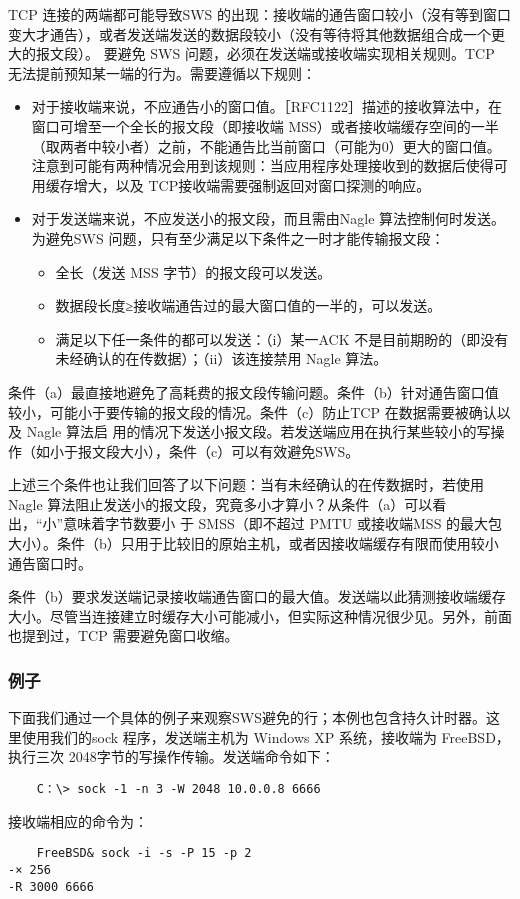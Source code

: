 TCP 连接的两端都可能导致SWS 的出现：接收端的通告窗口较小（沒有等到窗口变大才通告），或者发送端发送的数据段较小（没有等待将其他数据组合成一个更大的报文段）。
要避免 SWS 问题，必须在发送端或接收端实现相关规则。TCP 无法提前预知某一端的行为。需要遵循以下规则：
\begin{itemize}
    \item 对于接收端来说，不应通告小的窗口值。［RFC1122］描述的接收算法中，在窗口可增至一个全长的报文段（即接收端 MSS）或者接收端缓存空间的一半（取两者中较小者）之前，不能通告比当前窗口（可能为0）更大的窗口值。注意到可能有两种情况会用到该规则：当应用程序处理接收到的数据后使得可用缓存增大，以及 TCP接收端需要强制返回对窗口探测的响应。
    \item 对于发送端来说，不应发送小的报文段，而且需由Nagle 算法控制何时发送。为避免SWS 问题，只有至少满足以下条件之一时才能传输报文段：
    \begin{itemize}
        \item 全长（发送 MSS 字节）的报文段可以发送。
        \item 数据段长度≥接收端通告过的最大窗口值的一半的，可以发送。
        \item 满足以下任一条件的都可以发送：（i）某一ACK 不是目前期盼的（即没有未经确认的在传数据）；（ii）该连接禁用 Nagle 算法。
    \end{itemize}
\end{itemize}

条件（a）最直接地避免了高耗费的报文段传输问题。条件（b）针对通告窗口值较小，可能小于要传输的报文段的情况。条件（c）防止TCP 在数据需要被确认以及 Nagle 算法启
用的情况下发送小报文段。若发送端应用在执行某些较小的写操作（如小于报文段大小），条件（c）可以有效避免SWS。

上述三个条件也让我们回答了以下问题：当有未经确认的在传数据时，若使用Nagle 算法阻止发送小的报文段，究竟多小才算小？从条件（a）可以看出，“小”意味着字节数要小
于 SMSS（即不超过 PMTU 或接收端MSS 的最大包大小）。条件（b）只用于比较旧的原始主机，或者因接收端缓存有限而使用较小通告窗口时。

条件（b）要求发送端记录接收端通告窗口的最大值。发送端以此猜测接收端缓存大小。尽管当连接建立时缓存大小可能减小，但实际这种情况很少见。另外，前面也提到过，TCP
需要避免窗口收缩。

\subsubsection{例子}
下面我们通过一个具体的例子来观察SWS避免的行；本例也包含持久计时器。这里使用我们的sock 程序，发送端主机为 Windows XP 系统，接收端为 FreeBSD，执行三次
2048字节的写操作传输。发送端命令如下：
\begin{verbatim}
    C：\> sock -1 -n 3 -W 2048 10.0.0.8 6666
\end{verbatim}
接收端相应的命令为：
\begin{verbatim}
    FreeBSD& sock -i -s -P 15 -p 2
-× 256
-R 3000 6666
\end{verbatim}


